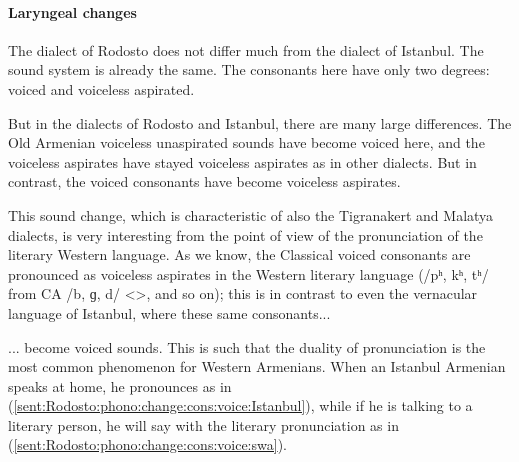 \paragraph{Laryngeal changes}\label{section:Rodosto:Phono:SoundChange:Laryngeal}
The dialect of Rodosto does not differ much from the dialect of Istanbul. The sound system is already the same. The consonants here have only two degrees: voiced and voiceless aspirated. 

But in the dialects of Rodosto and Istanbul, there are many large differences. The Old Armenian voiceless unaspirated sounds have become voiced here, and the voiceless aspirates have stayed voiceless aspirates as in other dialects. But in contrast, the voiced consonants have become voiceless aspirates. 


This sound change, which is characteristic of also the Tigranakert and Malatya dialects, is very interesting from the point of view of the pronunciation of the literary Western language. As we know, the Classical voiced consonants are pronounced as voiceless aspirates in the Western literary language (/pʰ, kʰ, tʰ/ from CA /b, ɡ, d/ <>, and so on); this is in contrast to even the vernacular language of Istanbul, where these same consonants... 



\begin{adjarianpage}\label{page:259}\end{adjarianpage}%

... become voiced sounds. This is such that the duality of pronunciation is the most common phenomenon for Western Armenians. When an Istanbul Armenian speaks at home, he pronounces as in (\ref{sent:Rodosto:phono:change:cons:voice:Istanbul}), while if he is talking to a literary person, he will say with the literary pronunciation as in (\ref{sent:Rodosto:phono:change:cons:voice:swa}).

